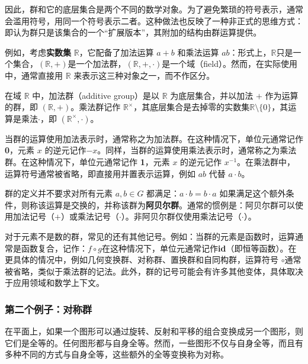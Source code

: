 因此，群和它的底层集合是两个不同的数学对象。为了避免繁琐的符号表示，通常会滥用符号，用同一个符号表示二者。这种做法也反映了一种非正式的思维方式：即认为群只是该集合的一个“扩展版本”，其附加的结构由群运算提供。  

例如，考虑\textbf{实数集} \( \mathbb{R} \)，它配备了加法运算 \( a + b \) 和乘法运算 \( ab \)：形式上，\( \mathbb{R} \)只是一个集合，\( (\mathbb{R}, +) \)是一个加法群，\( (\mathbb{R}, +, \cdot) \)是一个域（field）。然而，在实际使用中，通常直接用 \( \mathbb{R} \) 来表示这三种对象之一，而不作区分。  

在域 \( \mathbb{R} \) 中，加法群（additive group）是以 \( \mathbb{R} \) 为底层集合，并以加法 \( + \) 作为运算的群，即 \( (\mathbb{R}, +) \)。乘法群记作 \( \mathbb{R}^{\times} \)，其底层集合是去掉零的实数集\( \mathbb{R}\setminus \{0\} \)，其运算是乘法\( \cdot \)，即 \( (\mathbb{R}^\times, \cdot) \)。

当群的运算使用加法表示时，通常称之为加法群。在这种情况下，单位元通常记作\textbf{0}，元素 \( x \) 的逆元记作\(-x\)。同样，当群的运算使用乘法表示时，通常称之为乘法群。在这种情况下，单位元通常记作 \textbf{1}，元素 \( x \) 的逆元记作 \( x^{-1} \)。在乘法群中，运算符号通常被省略，即直接用并置表示运算，例如 \( ab \) 代替 \( a \cdot b \)。  

群的定义并不要求对所有元素 \( a, b \in G \) 都满足：\(a \cdot b = b \cdot a\) 如果满足这个额外条件，则称该运算是交换的，并称该群为\textbf{阿贝尔群}。通常的惯例是：阿贝尔群可以使用加法记号（\( + \)）或乘法记号（\( \cdot \)）。非阿贝尔群仅使用乘法记号（\( \cdot \)）。

对于元素不是数的群，常见的还有其他记号。例如：当群的元素是函数时，运算通常是函数复合，记作：\(f \circ g\)在这种情况下，单位元通常记作\textbf{id}（即恒等函数）。在更具体的情况中，例如几何变换群、对称群、置换群和自同构群，运算符号 \( \circ \)通常被省略，类似于乘法群的记法。此外，群的记号可能会有许多其他变体，具体取决于应用领域和数学上下文。
\subsubsection{第二个例子：对称群 }
在平面上，如果一个图形可以通过旋转、反射和平移的组合变换成另一个图形，则它们是全等的。任何图形都与自身全等。然而，一些图形不仅与自身全等，而且有多种不同的方式与自身全等，这些额外的全等变换称为对称。  

